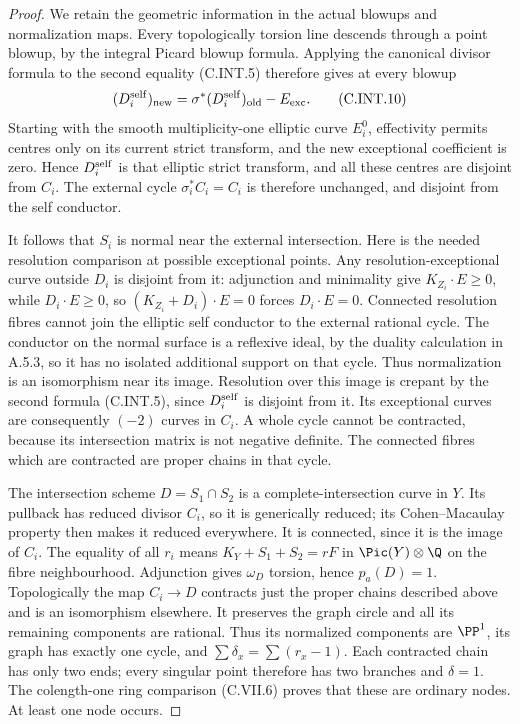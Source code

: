 \begin{proof}
We retain the geometric information in the actual
blowups and normalization maps. Every topologically
torsion line descends through a point blowup, by the
integral Picard blowup formula. Applying the
canonical divisor formula to the second equality
(C.INT.5) therefore gives at every blowup
\[
 (D_i^{\rm self})_{\rm new}
   =\sigma^*(D_i^{\rm self})_{\rm old}-E_{\rm exc}.
 \tag{C.INT.10}
\]
Starting with the smooth multiplicity-one elliptic
curve $E_i^0$, effectivity permits centres only on
its current strict transform, and the new
exceptional coefficient is zero. Hence
$D_i^{\rm self}$ is that elliptic strict transform,
and all these centres are disjoint from $C_i$.
The external cycle $\sigma_i^*C_i=C_i$ is therefore
unchanged, and disjoint from the self conductor.

It follows that $S_i$ is normal near the external
intersection. Here is the needed resolution
comparison at possible exceptional points. Any
resolution-exceptional curve outside $D_i$ is
disjoint from it: adjunction and minimality give
$K_{Z_i}\cdot E\ge0$, while $D_i\cdot E\ge0$,
so $(K_{Z_i}+D_i)\cdot E=0$ forces $D_i\cdot E=0$.
Connected resolution fibres cannot join the
elliptic self conductor to the external rational
cycle. The conductor on the normal surface is a
reflexive ideal, by the duality calculation in
A.5.3, so it has no isolated additional support
on that cycle. Thus normalization is an isomorphism
near its image. Resolution over this image is
crepant by the second formula (C.INT.5), since
$D_i^{\rm self}$ is disjoint from it. Its
exceptional curves are consequently $(-2)$
curves in $C_i$. A whole cycle cannot be contracted,
because its intersection matrix is not negative
definite. The connected fibres which are
contracted are proper chains in that cycle.

The intersection scheme $D=S_1\cap S_2$ is a
complete-intersection curve in $Y$. Its pullback
has reduced divisor $C_i$, so it is generically
reduced; its Cohen--Macaulay property then makes
it reduced everywhere. It is connected, since it
is the image of $C_i$. The equality of all $r_i$
means $K_Y+S_1+S_2=rF$ in $\Pic(Y)\otimes\Q$
on the fibre neighbourhood. Adjunction gives
$\omega_D$ torsion, hence $p_a(D)=1$.
Topologically the map $C_i\to D$ contracts just
the proper chains described above and is an
isomorphism elsewhere. It preserves the graph
circle and all its remaining components are
rational. Thus its normalized components are
$\PP^1$, its graph has exactly one cycle, and
$\sum\delta_x=\sum(r_x-1)$. Each contracted
chain has only two ends; every singular point
therefore has two branches and $\delta=1$.
The colength-one ring comparison (C.VII.6)
proves that these are ordinary nodes. At least
one node occurs.


\end{proof}
